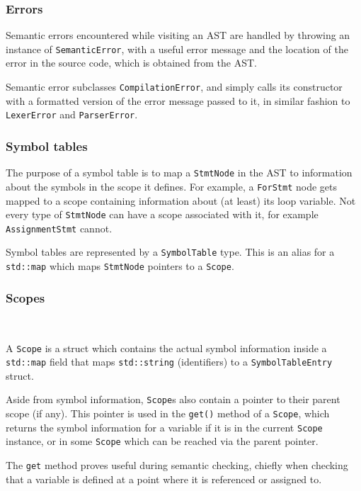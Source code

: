 \documentclass[11pt,a4paper]{scrartcl}
\begin{document}
\subsubsection{Errors}

Semantic errors encountered while visiting an AST are handled by throwing an instance of \verb|SemanticError|, with a useful error message and the location of the error in the source code, which is obtained from the AST.

Semantic error subclasses \verb|CompilationError|, and simply calls its constructor with a formatted version of the error message passed to it, in similar fashion to \verb|LexerError| and \verb|ParserError|.

\subsubsection{Symbol tables}

The purpose of a symbol table is to map a \verb|StmtNode| in the AST to information about the symbols in the scope it defines. For example, a \verb|ForStmt| node gets mapped to a scope containing information about (at least) its loop variable. Not every type of \verb|StmtNode| can have a scope associated with it, for example \verb|AssignmentStmt| cannot.

Symbol tables are represented by a \Verb|SymbolTable| type. This is an alias for a \verb|std::map| which maps \verb|StmtNode| pointers to a \verb|Scope|.

\subsubsection{Scopes}~\label{scope-sect}

A \verb|Scope| is a struct which contains the actual symbol information inside a \verb|std::map| field that maps \verb|std::string| (identifiers) to a \verb|SymbolTableEntry| struct.

Aside from symbol information, \verb|Scope|s also contain a pointer to their parent scope (if any). This pointer is used in the \verb|get()| method of a \verb|Scope|, which returns the symbol information for a variable if it is in the current \verb|Scope| instance, or in some \verb|Scope| which can be reached via the parent pointer.

The \verb|get| method proves useful during semantic checking, chiefly when checking that a variable is defined at a point where it is referenced or assigned to.
\end{document}
